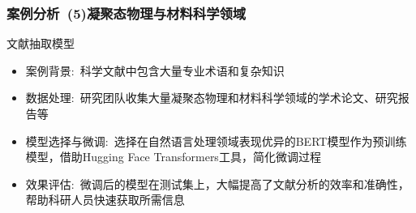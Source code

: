 %
\begin{frame}
	\frametitle{案例分析~\textrm{(5)}凝聚态物理与材料科学领域}
文献抽取模型
            \begin{itemize}
                \item 案例背景:~科学文献中包含大量专业术语和复杂知识\\
			{\fontsize{7.2pt}{6.2pt}\selectfont{通用大模型在处理专业文献、提取关键信息时，准确率较低，无法满足需求}}
                \item 数据处理:~研究团队收集大量凝聚态物理和材料科学领域的学术论文、研究报告等\\
			{\fontsize{7.2pt}{6.2pt}}
		\item 模型选择与微调:~选择在自然语言处理领域表现优异的\textrm{BERT}模型作为预训练模型，借助\textrm{Hugging Face Transformers}工具，简化微调过程\\
			{\fontsize{7.2pt}{6.2pt}}
                \item 效果评估:~微调后的模型在测试集上，大幅提高了文献分析的效率和准确性，帮助科研人员快速获取所需信息\\
			{\fontsize{7.2pt}{6.2pt}}			
            \end{itemize}
\end{frame}

